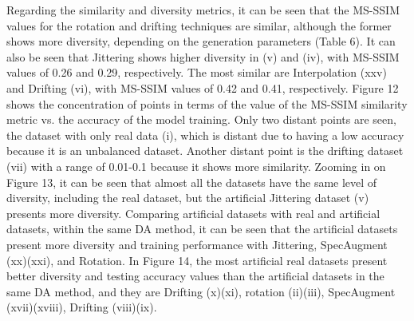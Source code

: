 \documentclass[journal]{IEEEtran}
\begin{document}
Regarding the similarity and diversity metrics, it can be seen that the MS-SSIM values for the rotation and drifting techniques are similar, although the former shows more diversity, depending on the generation parameters (Table 6).
It can also be seen that Jittering shows higher diversity in (v) and (iv), with MS-SSIM values of 0.26 and 0.29, respectively.
The most similar are Interpolation (xxv) and Drifting (vi), with MS-SSIM values of 0.42 and 0.41, respectively.
Figure 12 shows the concentration of points in terms of the value of the MS-SSIM similarity metric vs. the accuracy of the model training. Only two distant points are seen, the dataset with only real data (i), which is distant due to having a low accuracy because it is an unbalanced dataset. Another distant point is the drifting dataset (vii) with a range of 0.01-0.1 because it shows more similarity. Zooming in on Figure 13, it can be seen that almost all the datasets have the same level of diversity, including the real dataset, but the artificial Jittering dataset (v) presents more diversity. Comparing artificial datasets with real and artificial datasets, within the same DA method, it can be seen that the artificial datasets present more diversity and training performance with Jittering, SpecAugment (xx)(xxi), and Rotation.
In Figure 14, the most artificial real datasets present better diversity and testing accuracy values than the artificial datasets in the same DA method, and they are Drifting (x)(xi), rotation (ii)(iii), SpecAugment (xvii)(xviii), Drifting (viii)(ix).





%
%
\end{document}
